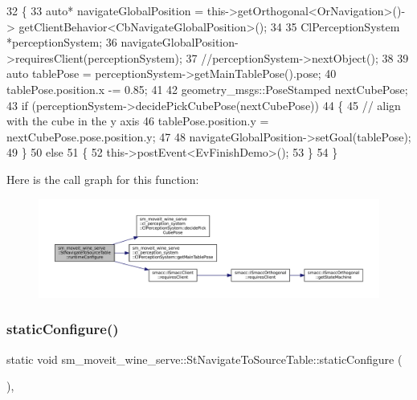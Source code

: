 \begin{DoxyCode}
32         \{
33             \textcolor{keyword}{auto}* navigateGlobalPosition = this->getOrthogonal<OrNavigation>()->
      getClientBehavior<CbNavigateGlobalPosition>();
34             
35             ClPerceptionSystem *perceptionSystem;
36             navigateGlobalPosition->requiresClient(perceptionSystem);
37             \textcolor{comment}{//perceptionSystem->nextObject();}
38 
39             \textcolor{keyword}{auto} tablePose = perceptionSystem->getMainTablePose().pose;
40             tablePose.position.x -= 0.85;
41 
42             geometry\_msgs::PoseStamped nextCubePose;
43             \textcolor{keywordflow}{if} (perceptionSystem->decidePickCubePose(nextCubePose))
44             \{
45                 \textcolor{comment}{// align with the cube in the y axis}
46                 tablePose.position.y = nextCubePose.pose.position.y;
47 
48                 navigateGlobalPosition->setGoal(tablePose);
49             \}
50             \textcolor{keywordflow}{else}
51             \{
52                 this->postEvent<EvFinishDemo>();
53             \}
54         \}
\end{DoxyCode}
Here is the call graph for this function\+:
\nopagebreak
\begin{figure}[H]
\begin{center}
\leavevmode
\includegraphics[width=350pt]{structsm__moveit__wine__serve_1_1StNavigateToSourceTable_a0824dc79b8a2749eaa90b1d27217c5ab_cgraph}
\end{center}
\end{figure}
\mbox{\label{structsm__moveit__wine__serve_1_1StNavigateToSourceTable_add34e4ac8376542453f905b5ec684990}} 
\subsubsection{\texorpdfstring{static\+Configure()}{staticConfigure()}}
{\footnotesize\ttfamily static void sm\+\_\+moveit\+\_\+wine\+\_\+serve\+::\+St\+Navigate\+To\+Source\+Table\+::static\+Configure (\begin{DoxyParamCaption}{ }\end{DoxyParamCaption})\hspace{0.3cm}{\ttfamily [inline]}, {\ttfamily [static]}}



